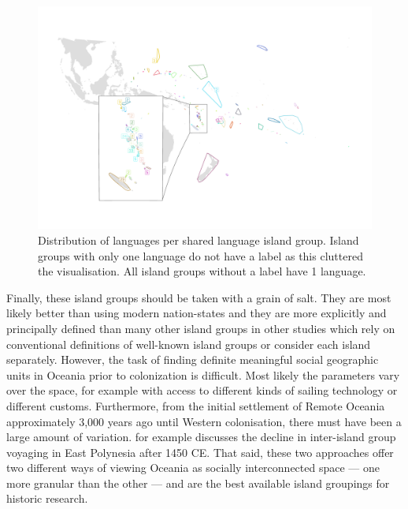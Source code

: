 \documentclass[a4paper,10pt]{article} %
\begin{document}
\begin{figure}
\centering
\includegraphics[width=26cm]{polygon_medium_group_map_vanuatu_mh_inset.png}
\caption{{Distribution of languages per shared language island group. Island groups with only one language do not have a label as this cluttered the visualisation. All island groups without a label have 1 language.}}
\label{polygon_plot_medium}
\end{figure}

Finally, these island groups should be taken with a grain of salt. They are most likely better than using modern nation-states and they are more explicitly and principally defined than many other island groups in other studies which rely on conventional definitions of well-known island groups or consider each island separately. However, the task of finding definite meaningful social geographic units in Oceania prior to colonization is difficult. Most likely the parameters vary over the space, for example with access to different kinds of sailing technology or different customs. Furthermore, from the initial settlement of Remote Oceania approximately 3,000 years ago until Western colonisation, there must have been a large amount of variation. \citep{rolett2002voyaging} for example discusses the decline in inter-island group voyaging in East Polynesia after 1450 CE. That said, these two approaches offer two different ways of viewing Oceania as socially interconnected space --- one more granular than the other --- and are the best available island groupings for historic research.
\end{document}
